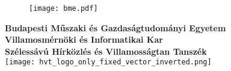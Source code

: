 \begin{titlepage}

\begin{figure}
\centering
\texttt{[image: bme.pdf]}
\end{figure}

\centering
\textbf{Budapesti Műszaki és Gazdaságtudományi Egyetem}\\
\textbf{Villamosmérnöki és Informatikai Kar}\\
\textbf{Szélessávú Hírközlés és Villamosságtan Tanszék}\\
\vspace{5mm}
\texttt{[image: hvt\_logo\_only\_fixed\_vector\_inverted.png]}  \\
\vspace{40mm}
\Huge
\dokumentumcim\\
\vspace{50mm}
\Large
\thetitle \\
\vspace{12mm}
\Large
\textbf{\theauthor}\\
\vspace{12mm}
\the\year


\end{titlepage}